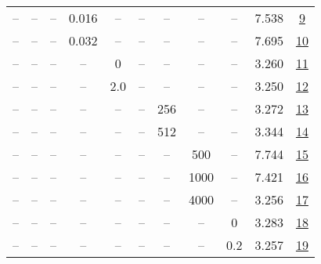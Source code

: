 \begin{table}[H]
\begin{tabular}{ccccccccccc}
-- & -- & -- & 0.016 & -- & -- & -- & -- & -- & 7.538 & \href{https://wandb.ai/stanford-mercury/optimizer-scaling/runs/sweep-300m-6B-nadamwb4c393lr0.016-wd0.1-minlr0-warmup2000-b10.95-ea7a28}{9} \\
-- & -- & -- & 0.032 & -- & -- & -- & -- & -- & 7.695 & \href{https://wandb.ai/stanford-mercury/optimizer-scaling/runs/sweep-300m-6B-nadamw33ba92lr0.032-wd0.1-minlr0-warmup2000-b10.95-131dc6}{10} \\
-- & -- & -- & -- & 0 & -- & -- & -- & -- & 3.260 & \href{https://wandb.ai/stanford-mercury/optimizer-scaling/runs/sweep-300m-6B-nadamw05eb2blr0.008-wd0.1-minlr0-warmup2000-b10.95-e73f92}{11} \\
-- & -- & -- & -- & 2.0 & -- & -- & -- & -- & 3.250 & \href{https://wandb.ai/stanford-mercury/optimizer-scaling/runs/sweep-300m-6B-nadamwefd789lr0.008-wd0.1-minlr0-warmup2000-b10.95-adccc7}{12} \\
-- & -- & -- & -- & -- & -- & 256 & -- & -- & 3.272 & \href{https://wandb.ai/stanford-mercury/optimizer-scaling/runs/sweep-300m-6B-nadamwac3d1clr0.008-wd0.1-minlr0-warmup2000-b10.95-62f9ad}{13} \\
-- & -- & -- & -- & -- & -- & 512 & -- & -- & 3.344 & \href{https://wandb.ai/stanford-mercury/optimizer-scaling/runs/sweep-300m-6B-nadamw3e994elr0.008-wd0.1-minlr0-warmup2000-b10.95-41f06f}{14} \\
-- & -- & -- & -- & -- & -- & -- & 500 & -- & 7.744 & \href{https://wandb.ai/stanford-mercury/optimizer-scaling/runs/sweep-300m-6B-nadamw38bf56lr0.008-wd0.1-minlr0-warmup500-b10.95--60b55d}{15} \\
-- & -- & -- & -- & -- & -- & -- & 1000 & -- & 7.421 & \href{https://wandb.ai/stanford-mercury/optimizer-scaling/runs/sweep-300m-6B-nadamw893e1dlr0.008-wd0.1-minlr0-warmup1000-b10.95-62bb8f}{16} \\
-- & -- & -- & -- & -- & -- & -- & 4000 & -- & 3.256 & \href{https://wandb.ai/stanford-mercury/optimizer-scaling/runs/sweep-300m-6B-nadamw7d5985lr0.008-wd0.1-minlr0-warmup4000-b10.95-876f95}{17} \\
-- & -- & -- & -- & -- & -- & -- & -- & 0 & 3.283 & \href{https://wandb.ai/stanford-mercury/optimizer-scaling/runs/sweep-300m-6B-nadamwe5c125lr0.008-wd0-minlr0-warmup2000-b10.95-b-2568cb}{18} \\
-- & -- & -- & -- & -- & -- & -- & -- & 0.2 & 3.257 & \href{https://wandb.ai/stanford-mercury/optimizer-scaling/runs/sweep-300m-6B-nadamw261788lr0.008-wd0.2-minlr0-warmup2000-b10.95-157b6b}{19} \\
\bottomrule
\end{tabular}
\end{table}

